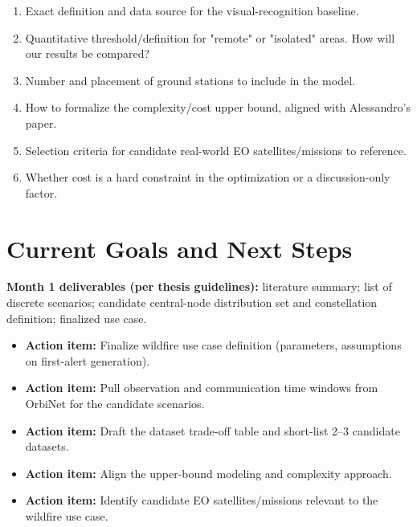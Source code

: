 \documentclass[11pt]{article}
\newcommand{\actionitem}[1]{\textcolor{todo}{\textbf{Action item:}} #1}
\begin{document}
\begin{enumerate}[leftmargin=1.2cm]
    \item Exact definition and data source for the visual-recognition baseline.
    \item Quantitative threshold/definition for "remote" or "isolated" areas. How will our results be compared?
    \item Number and placement of ground stations to include in the model.
    \item How to formalize the complexity/cost upper bound, aligned with Alessandro's paper.
    \item Selection criteria for candidate real-world EO satellites/missions to reference.
    \item Whether cost is a hard constraint in the optimization or a discussion-only factor.
\end{enumerate}

\section{Current Goals and Next Steps}

\textbf{Month 1 deliverables (per thesis guidelines):} literature summary; list of discrete scenarios; candidate central-node distribution set and constellation definition; finalized use case.

\begin{itemize}[leftmargin=1.2cm]
    \item \actionitem{Finalize wildfire use case definition (parameters, assumptions on first-alert generation).}
    \item \actionitem{Pull observation and communication time windows from OrbiNet for the candidate scenarios.}
    \item \actionitem{Draft the dataset trade-off table and short-list 2--3 candidate datasets.}
    \item \actionitem{Align the upper-bound modeling and complexity approach.}
    \item \actionitem{Identify candidate EO satellites/missions relevant to the wildfire use case.}
\end{itemize}

\printbibliography
\end{document}
